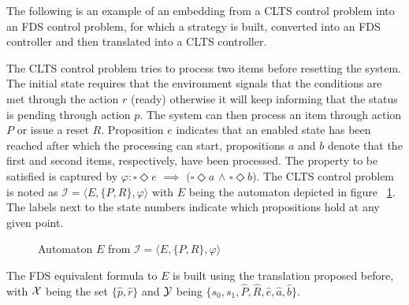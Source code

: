 The following is an example of an embedding from a CLTS control problem into an FDS control problem, for which a strategy is built, converted into an FDS controller and then translated into a CLTS controller. 

The CLTS control problem tries to process two items before resetting the system. The initial state requires that the environment signals that the conditions are met through the action $r$ (ready) otherwise it will keep informing that the status is pending through action $p$.  The system can then process an item through action $P$ or issue a reset $R$. Proposition $e$ indicates that an enabled state has been reached after which the processing can start, propositions $a$ and $b$ denote that the first and second items, respectively, have been processed. 
The property to be satisfied is captured by $\varphi: \square \Diamond e$ $\implies$ $(\square \Diamond a$ $\wedge$ $\square \Diamond b)$. The CLTS control problem is noted as $\mathcal{I}=\langle E, \{P,R\}, \varphi \rangle$ with $E$ being the automaton depicted in figure ~\ref{fig:clts_to_fds_E}. The labels next to the state numbers indicate which propositions hold at any given point.

\begin{figure}[bt]
	\centering
	\caption{Automaton $E$ from $\mathcal{I}=\langle E, \{P,R\}, \varphi \rangle$}
	\label{fig:clts_to_fds_E}
\end{figure}

The FDS equivalent formula to $E$ is built using the translation proposed before, with ${\mathcal{X}}$ being the set $\{\hat{p},\hat{r}\}$ and ${\mathcal{Y}}$ being $\{s_0,s_1,\hat{P},\hat{R},\hat{e},\hat{a},\hat{b}\}$.

